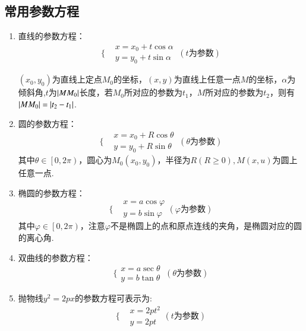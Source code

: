 \documentclass{BHCexam}
\begin{document}
\subsection{常用参数方程}
\begin{enumerate}
\item 直线的参数方程：\[\Bigg\{\begin{aligned}
&x=x_0+t\cos \alpha\\
&y=y_0+t\sin\alpha 
\end{aligned}{~(t\text{为参数})}
\]
\begin{center}
\end{center}
{\kaishu $(x_0,y_0)$为直线上定点$ M_0 $的坐标，$ (x,y) $为直线上任意一点$ M $的坐标，$ \alpha $为倾斜角,$ t $为$ \left|MM_0\right| $长度，若$M_0$所对应的参数为$ t_1 $，$ M $所对应的参数为$ t_2 $，则有$ \left|MM_0\right|=\left|t_2-t_1\right| $.}
\item 圆的参数方程：\[\Bigg\{\begin{aligned}
&x=x_0+R\cos\theta \\
&y=y_0+R\sin\theta
\end{aligned}~(\theta\text{为参数})\]{\kaishu 其中$\theta \in\left[0,2\pi\right)$，圆心为$ M_0(x_0,y_0) $，半径为$ R(R\ge0),M(x,u) $为圆上任意一点.}
\item 椭圆的参数方程：
\[\Bigg\{\begin{aligned}
&x=a\cos\varphi\\
&y=b\sin\varphi
\end{aligned}(\varphi\text{为参数})\]
{\kaishu 其中$\varphi\in\left[0,2\pi\right)$，注意$ \varphi $不是椭圆上的点和原点连线的夹角，是椭圆对应的圆的离心角.}
\item 双曲线的参数方程：\[\Bigg\{\begin{aligned}
x=a\sec\theta\\
y=b\tan \theta
\end{aligned}
{~(\theta\text{为参数})}\]
\item 抛物线$ y^2=2px $的参数方程可表示为:\[\Bigg\{\begin{aligned}
&x=2pt^2\\&y=2pt
\end{aligned}(t\text{为参数})\] 
\end{enumerate}
\end{document}
